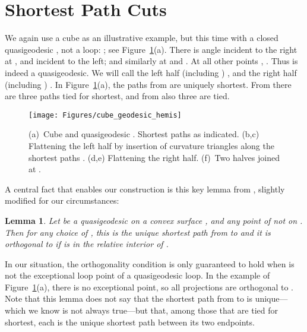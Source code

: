 \pdfoutput=1  \documentclass[]{article}
\newtheorem{lemma}[theorem]{Lemma}
\newcommand{\lemlab}[1]{\label{lemma:#1}}
\newcommand{\figlab}[1]{\label{fig:#1}}
\newcommand{\figref}[1]{\ref{fig:#1}}
\begin{document}
\section{Shortest Path Cuts}
We again use
a cube as an illustrative example, but this time with a 
closed quasigeodesic , not a loop: 
; see
Figure~\figref{cube_geodesic_hemis}(a).
There is  angle incident to the right at , 
and  incident to
the left; and similarly at  and .  At all other
points , .  Thus  is indeed a quasigeodesic.
We will call the left half (including ) , and the right half 
(including ) .
In Figure~\figref{cube_geodesic_hemis}(a), the paths from 
are uniquely shortest.
From  there are three paths tied for shortest, and from
 also three are tied.
\begin{figure}[htbp]
\centering
\texttt{[image: Figures/cube\_geodesic\_hemis]}
\caption{
(a)~Cube and quasigeodesic . 
Shortest paths  as indicated.
(b,c) Flattening the left half  by insertion of curvature triangles
along the shortest paths .
(d,e) Flattening the right half.
(f)~Two halves joined at .
}
\figlab{cube_geodesic_hemis}
\end{figure}


A central fact that enables our construction is this key lemma from
\cite[Cor.~1]{iiv-qfpcs-07}, slightly modified for our circumstances:

\begin{lemma}                                                                   
Let  be a quasigeodesic on a convex surface , and  any point of       
 not on .                                                                
Then for any choice of , this is the unique shortest path from      
 to  and it is orthogonal to  if  is in the relative              
interior of .                                                                
\lemlab{IIV}                                                                    
\end{lemma}


In our situation, the orthogonality condition is only guaranteed
to hold when  is not the exceptional loop point  of a quasigeodesic
loop.  In the example of Figure~\figref{cube_geodesic_hemis}(a),
there is no exceptional point, so all projections are orthogonal
to .
Note that this lemma does
not say that the shortest path from  to  is unique---which we
know is not always true---but that,
among those that are tied for shortest, each is the unique shortest path
between its two endpoints.
\end{document}
